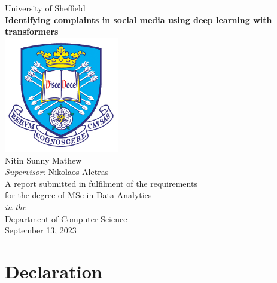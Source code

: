 \documentclass[11pt,oneside]{book}
\begin{document}
\frontmatter

\begin{titlepage}


    \begin{center}
        {\LARGE University of Sheffield}\\[1.5cm]
        \linespread{1.2}\huge {\bfseries Identifying complaints in social media using deep learning with transformers}\\[1.5cm]
        \linespread{1}
        \includegraphics[width=5cm]{images/tuoslogo.png}\\[1cm]
        {\Large Nitin Sunny Mathew}\\[1cm]
        {\large \emph{Supervisor:} Nikolaos Aletras}\\[1cm]
        \large A report submitted in fulfilment of the requirements\\ for the degree of MSc in Data Analytics\\[0.3cm]
        \textit{in the}\\[0.3cm]
        Department of Computer Science\\[2cm]
        September 13, 2023\\
    \end{center}

\end{titlepage}


\newpage
\chapter*{\Large Declaration}

\end{document}
